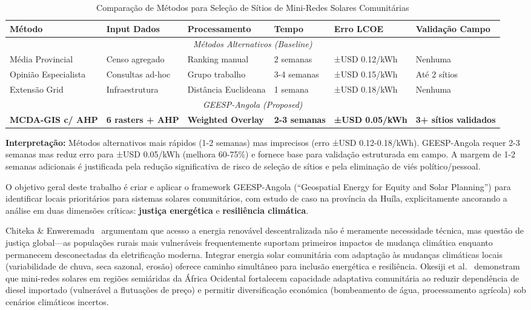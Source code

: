 \documentclass[12pt, a4paper]{article}
\begin{document}
\begin{table}[H]
\centering
\caption{Comparação de Métodos para Seleção de Sítios de Mini-Redes Solares Comunitárias}
\label{tab:metodo_comparacao}
\footnotesize
\begin{tabular}{|l|l|l|l|l|l|}
\hline
\textbf{Método} & \textbf{Input Dados} & \textbf{Processamento} & \textbf{Tempo} & \textbf{Erro LCOE} & \textbf{Validação Campo} \\
\hline
\multicolumn{6}{|c|}{\textit{Métodos Alternativos (Baseline)}} \\
\hline
Média Provincial & Censo agregado & Ranking manual & 2 semanas & ±USD 0.12/kWh & Nenhuma \\
\hline
Opinião Especialista & Consultas ad-hoc & Grupo trabalho & 3-4 semanas & ±USD 0.15/kWh & Até 2 sítios \\
\hline
Extensão Grid & Infraestrutura & Distância Euclideana & 1 semana & ±USD 0.18/kWh & Nenhuma \\
\hline
\multicolumn{6}{|c|}{\textit{GEESP-Angola (Proposed)}} \\
\hline
\textbf{MCDA-GIS c/ AHP} & \textbf{6 rasters + AHP} & \textbf{Weighted Overlay} & \textbf{2-3 semanas} & \textbf{±USD 0.05/kWh}\footnotemark[1] & \textbf{3+ sítios validados} \\
\hline
\end{tabular}
\end{table}


\noindent\textbf{Interpretação:} Métodos alternativos mais rápidos (1-2 semanas) mas imprecisos (erro ±USD 0.12-0.18/kWh). GEESP-Angola requer 2-3 semanas mas reduz erro para ±USD 0.05/kWh (melhora 60-75\%) e fornece base para validação estruturada em campo. A margem de 1-2 semanas adicionais é justificada pela redução significativa de risco de seleção de sítios e pela eliminação de viés político/pessoal.

O objetivo geral deste trabalho é criar e aplicar o framework GEESP-Angola (``Geospatial Energy for Equity and Solar Planning'') para identificar locais prioritários para sistemas solares comunitários, com estudo de caso na província da Huíla, explicitamente ancorando a análise em duas dimensões críticas: 
\textbf{justiça energética} e 
\textbf{resiliência climática}.

Chiteka \& Enweremadu~\citep{Chiteka2025} argumentam que acesso a energia renovável descentralizada não é meramente necessidade técnica, mas questão de justiça global—as populações rurais mais vulneráveis frequentemente suportam primeiros impactos de mudança climática enquanto permanecem desconectadas da eletrificação moderna. Integrar energia solar comunitária com adaptação às mudanças climáticas locais (variabilidade de chuva, seca sazonal, erosão) oferece caminho simultâneo para inclusão energética e resiliência. Okesiji et al.~\citep{Okesiji2025} demonstram que mini-redes solares em regiões semiáridas da África Ocidental fortalecem capacidade adaptativa comunitária ao reduzir dependência de diesel importado (vulnerável a flutuações de preço) e permitir diversificação económica (bombeamento de água, processamento agrícola) sob cenários climáticos incertos.
\end{document}
